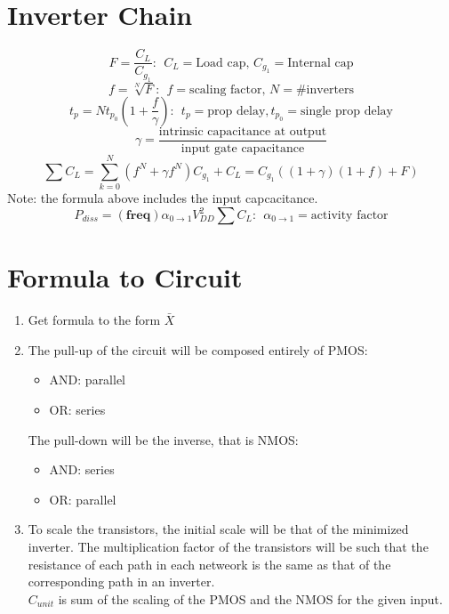 \documentclass[twocolumn]{article}
\begin{document}
\section*{Inverter Chain}
\pagestyle{empty}
\begin{equation*}
    F = \frac{C_L}{C_{g_1}}:~~ C_L=\text{Load cap, } C_{g_1}=\text{Internal cap}
\end{equation*}
\begin{equation*}
    f = \sqrt[N]{F}:~~ f=\text{scaling factor, } N=\text{\# inverters}
\end{equation*}
\begin{equation*}
    t_p = Nt_{p_0}\left(1+\frac{f}{\gamma}\right):~~t_p=\text{prop delay}, t_{p_0} = \text{single  prop delay}
\end{equation*}
\begin{equation*}
    \gamma = \frac{\text{intrinsic capacitance at output}}{\text{input gate capacitance}}
\end{equation*}
\begin{equation*}
    \sum C_L = \sum_{k=0}^{N} (f^N+\gamma f^N)C_{g_1}+C_L = C_{g_1}((1+\gamma)(1+f)+F)
\end{equation*}
Note: the formula above includes the input capcacitance.
\begin{equation*}
    P_{diss} = (\textbf{freq})\alpha_{0\rightarrow 1}V_{DD}^2\sum C_L:~~ \alpha_{0\rightarrow 1}=\text{activity factor}
\end{equation*}
\section*{Formula to Circuit}
\begin{enumerate}
    \item Get formula to the form $\bar{X}$
    \item The pull-up of the circuit will be composed entirely of PMOS:
          \begin{itemize}
              \item AND: parallel
              \item OR: series
          \end{itemize}
          The pull-down will be the inverse, that is NMOS:
          \begin{itemize}
              \item AND: series
              \item OR: parallel
          \end{itemize}
    \item To scale the transistors, the initial scale will be that of the minimized
          inverter. The multiplication factor of the transistors will be such that the resistance of each path in each netweork is the same as that of the corresponding path in an inverter.\\
          $C_{unit}$ is sum of the scaling of the PMOS and the NMOS for the given input.
\end{enumerate}
\end{document}
